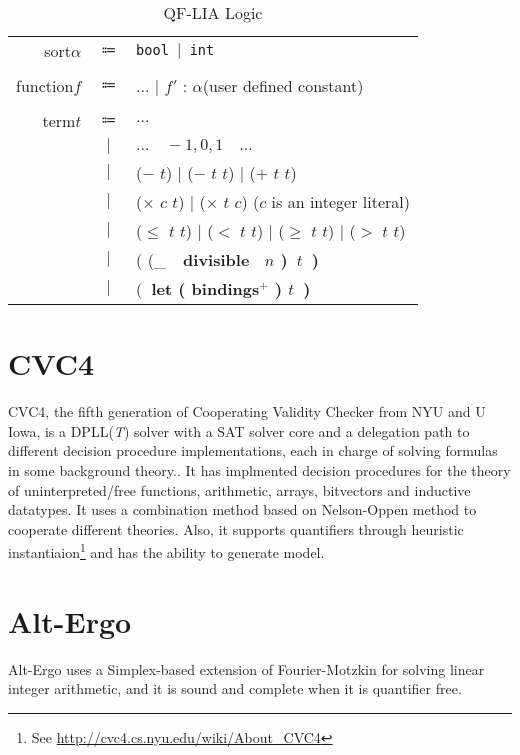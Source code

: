 \documentclass[11pt,letter]{article}
\theoremstyle{definition}
\begin{document}
\begin{table}[h]
\begin{mdframed}
\centering
\begin{tabular}{r c l}
sort\qquad $\alpha$ & $\Coloneqq$ & \tt bool $\mid$ int\\
\\
function\qquad $f$ & $\Coloneqq$ & $\ldots$ $\mid$ \rm $f'$ : $\alpha$\qquad(user defined constant)\\
\\
term\qquad $t$ & $\Coloneqq$ & $\ldots$ \\
& $\mid$ & $\ldots\quad-1,0,1\quad\ldots$\\
& $\mid$ & ($-$ $t$) $\mid$ ($-$ $t$ $t$) $\mid$ ($+$ $t$ $t$) \\
& $\mid$ & ($\times$ $c$ $t$) $\mid$ ($\times$ $t$ $c$) \qquad($c$ is an integer literal)\\
& $\mid$ & ($\leqslant$ $t$ $t$) $\mid$ ($<$ $t$ $t$) $\mid$ ($\geqslant$ $t$ $t$) $\mid$ ($>$ $t$ $t$)\\
& $\mid$ & ( (_\ \bf\ divisible \rm\ $n$ )\ $t$\ )\\
& $\mid$ & (\bf\ let \rm ( bindings$^+$ ) $t$\ )\\

\end{tabular}
\end{mdframed}
\caption{QF-LIA Logic}
\end{table}

\section{CVC4}
CVC4, the fifth generation of Cooperating Validity Checker from NYU and U Iowa, is a DPLL({\it T}) solver with a SAT solver core and a delegation path to different decision procedure implementations, each in charge of solving formulas in some background theory.\cite{barrett:cvc4:2011}. It has implmented decision procedures for the theory of uninterpreted/free functions, arithmetic, arrays, bitvectors and inductive datatypes. It uses a combination method based on Nelson-Oppen method to cooperate different theories. Also, it supports quantifiers through heuristic instantiaion\footnote{See \url{http://cvc4.cs.nyu.edu/wiki/About_CVC4}} and has the ability to generate model.

\section{Alt-Ergo}

Alt-Ergo uses a Simplex-based extension of Fourier-Motzkin for solving linear integer arithmetic, and it is sound and complete when it is quantifier free\cite{bobot:hal-00687640}.




\end{document}
